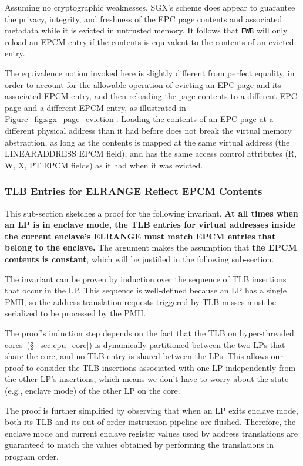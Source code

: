 Assuming no cryptographic weaknesses, SGX's scheme does appear to guarantee the
privacy, integrity, and freshness of the EPC page contents and associated
metadata while it is evicted in untrusted memory. It follows that \texttt{EWB}
will only reload an EPCM entry if the contents is equivalent to the contents of
an evicted entry.

The equivalence notion invoked here is slightly different from perfect
equality, in order to account for the allowable operation of evicting an EPC
page and its associated EPCM entry, and then reloading the page contents to a
different EPC page and a different EPCM entry, as illustrated in
Figure~\ref{fig:sgx_page_eviction}. Loading the contents of an EPC page at a
different physical address than it had before does not break the virtual memory
abstraction, as long as the contents is mapped at the same virtual address
(the LINEARADDRESS EPCM field), and has the same access control attributes
(R, W, X, PT EPCM fields) as it had when it was evicted.


\subsubsection{TLB Entries for ELRANGE Reflect EPCM Contents}

This sub-section sketches a proof for the following invariant. \textbf{At all
times when an LP is in enclave mode, the TLB entries for virtual addresses
inside the current  enclave's ELRANGE must match EPCM entries that belong to
the enclave.} The argument makes the assumption that \textbf{the EPCM contents
is constant}, which will be justified in the following sub-section.

The invariant can be proven by induction over the sequence of TLB insertions
that occur in the LP. This sequence is well-defined because an LP has a single
PMH, so the address translation requests triggered by TLB misses must be
serialized to be processed by the PMH.

The proof's induction step depends on the fact that the TLB on hyper-threaded
cores~(\S~\ref{sec:cpu_core}) is dynamically partitioned between the two LPs
that share the core, and no TLB entry is shared between the LPs. This allows
our proof to consider the TLB insertions associated with one LP independently
from the other LP's insertions, which means we don't have to worry about the
state (e.g., enclave mode) of the other LP on the core.

The proof is further simplified by observing that when an LP exits enclave
mode, both its TLB and its out-of-order instruction pipeline are flushed.
Therefore, the enclave mode and current enclave register values used by address
translations are guaranteed to match the values obtained by performing the
translations in program order.

